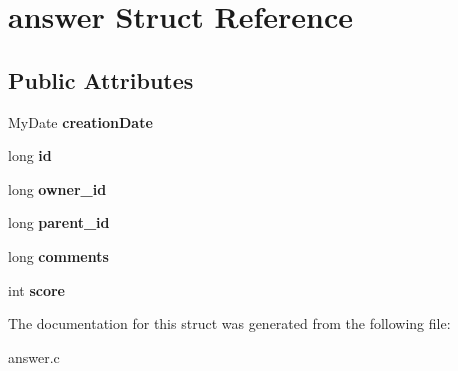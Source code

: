 \hypertarget{structanswer}{}\section{answer Struct Reference}
\label{structanswer}
\subsection*{Public Attributes}
\begin{DoxyCompactItemize}
\item 
My\+Date {\bfseries creation\+Date}\hypertarget{structanswer_a979075a55ddca2c5a2015d02c91f3f1a}{}\label{structanswer_a979075a55ddca2c5a2015d02c91f3f1a}

\item 
long {\bfseries id}\hypertarget{structanswer_a04c931fbeab39e0ad2c45be06f383435}{}\label{structanswer_a04c931fbeab39e0ad2c45be06f383435}

\item 
long {\bfseries owner\+\_\+id}\hypertarget{structanswer_a858ddf907cce170f0bf2d917aa55b1d4}{}\label{structanswer_a858ddf907cce170f0bf2d917aa55b1d4}

\item 
long {\bfseries parent\+\_\+id}\hypertarget{structanswer_a88295448306574b300bfd1cebad04adb}{}\label{structanswer_a88295448306574b300bfd1cebad04adb}

\item 
long {\bfseries comments}\hypertarget{structanswer_abcb45f780595dc4226a169ba481a37af}{}\label{structanswer_abcb45f780595dc4226a169ba481a37af}

\item 
int {\bfseries score}\hypertarget{structanswer_a6337a9830b3dff45ba93aca153c97973}{}\label{structanswer_a6337a9830b3dff45ba93aca153c97973}

\end{DoxyCompactItemize}


The documentation for this struct was generated from the following file\+:\begin{DoxyCompactItemize}
\item 
answer.\+c\end{DoxyCompactItemize}
